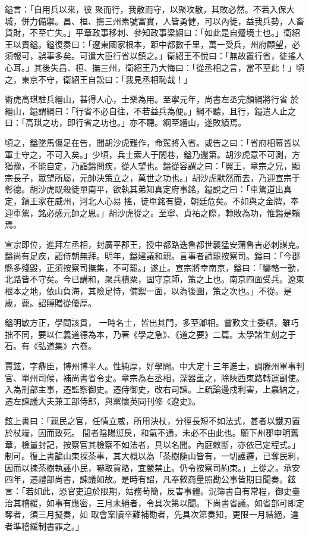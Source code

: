 \begin{pinyinscope}
 鎰言：「自用兵以來，彼
 聚而行，我散而守，以聚攻散，其敗必然。不若入保大城，併力備禦。昌、桓、撫三州素號富實，人皆勇健，可以內徙，益我兵勢，人畜貨財，不至亡失。」平章政事移刺、參知政事梁絪曰：「如此是自蹙境土也。」衛紹王以責鎰。鎰復奏曰：「遼東國家根本，距中都數千里，萬一受兵，州府顧望，必須報可，誤事多矣。可遣大臣行省以鎮之。」衛紹王不悅曰：「無故置行省，徒搖人心耳。」其後失昌、桓、撫三州，衛紹王乃大悔曰：「從丞相之言，當不至此！」頃之，東京不守，衛紹王自訟曰：「我見丞相恥哉！」



 術虎高琪駐兵縉山，甚得人心，士樂為用。至寧元年，尚書左丞完顏綱將行省
 於縉山，鎰謂綱曰：「行省不必自往，不若益兵為便。」綱不聽，且行，鎰遣人止之曰：「高琪之功，即行省之功也。」亦不聽。綱至縉山，遂敗績焉。



 頃之，鎰墜馬傷足在告，聞胡沙虎難作，命駕將入省。或告之曰：「省府相幕皆以軍士守之，不可入矣。」少頃，兵士索人于閭巷，鎰乃還第。胡沙虎意不可測，方猶豫，不能自定，乃詣鎰問疾，從人望也。鎰從容謂之曰：「翼王，章宗之兄，顯宗長子，眾望所屬，元帥決策立之，萬世之功也。」胡沙虎默然而去，乃迎宣宗于彰德。胡沙虎既殺徒單南平，欲執其弟知真定府事銘，鎰說之曰：「車駕道出真定，鎬王家在威州，河北人心易
 搖，徒單銘有變，朝廷危矣。不如與之金牌，奉迎車駕，銘必感元帥之恩。」胡沙虎從之。至寧、貞祐之際，轉敗為功，惟鎰是賴焉。



 宣宗即位，進拜左丞相，封廣平郡王，授中都路迭魯都世襲猛安蒲魯吉必剌謀克。鎰尚有足疾，詔侍朝無拜。明年，鎰建議和親。言事者請罷按察司。鎰曰：「今郡縣多殘毀，正須按察司撫集，不可罷。」遂止。宣宗將幸南京，鎰曰：「鑾輅一動，北路皆不守矣。今已講和，聚兵積粟，固守京師，策之上也。南京四面受兵。遼東根本之地，依山負海，其險足恃，備禦一面，以為後圖，策之次也。」不從。是歲，薨。詔賻贈從優厚。



 鎰明敏方正，學問該貫，
 一時名士，皆出其門，多至卿相。嘗歎文士委頓，雖巧拙不同，要以仁義道德為本，乃著《學之急》、《道之要》二篇。太學諸生刻之于石。有《弘道集》六卷。



 賈鉉，字鼎臣，博州博平人。性純厚，好學問。中大定十三年進士，調滕州軍事判官、單州司候，補尚書省令史。章宗為右丞相，深器重之，除陜西東路轉運副使。入為刑部主事，遷監察御史。遷侍御史，改右司諫。上疏論邊戍利害，上嘉納之，遷左諫議大夫兼工部侍郎，與黨懷英同刊修《遼史》。



 鉉上書曰：「親民之官，任情立威，所用決杖，分徑長短不如法式，甚者以鐵刃置於杖端，因而致死。
 間者陰陽愆戾，和氣不通，未必不由此也。願下州郡申明舊章，檢量封記，按察官其檢察不如法者，具以名聞。內庭敕斷，亦依已定程式。」制可。復上書論山東採茶事，其大概以為「茶樹隨山皆有，一切護邏，已奪民利，因而以揀茶樹執誣小民，嚇取貨賂，宜嚴禁止。仍令按察司約束。」上從之。承安四年，遷禮部尚書，諫議如故。是時有詔，凡奉敕商量照勘公事皆期日聞奏。鉉言：「若如此，恐官吏迫於限期，姑務茍簡，反害事體。況簿書自有常程，御史臺治其稽緩，如事有應密，三月未絕者，令具次第以聞。下尚書省議。如省部可即定奪者，須三月擬奏，如
 取會案牘卒難補勘者，先具次第奏知，更限一月結絕，違者準稽緩制書罪之。」




\end{pinyinscope}
